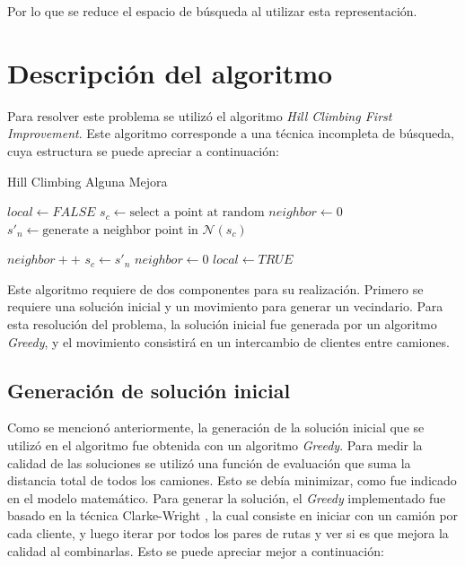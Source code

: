 \documentclass{article}
\begin{document}
Por lo que se reduce el espacio de búsqueda al utilizar esta representación. 
\newpage
\section{Descripci\'on del algoritmo}
Para resolver este problema se utilizó el algoritmo \textit{Hill Climbing First Improvement}. Este algoritmo corresponde a una técnica incompleta de búsqueda, cuya estructura se puede apreciar a continuación:
\begin{algorithm}
    \caption{Hill Climbing Alguna Mejora}\label{alg:cap}
    \begin{algorithmic}
        \State $local \gets FALSE$
        \State $s_c \gets \text{select a point at random}$
        \State $neighbor \gets 0$
        \Repeat
        \State $s'_n \gets \text{generate a neighbor point in } \mathscr{N}(s_c)$
        
        $neighbor++$
            \State $s_c \gets s'_n$
            \State $neighbor \gets 0$
        \EndIf
            \State $local \gets TRUE$
        \EndIf
    \end{algorithmic}
\end{algorithm}

Este algoritmo requiere de dos componentes para su realización. Primero se requiere una solución inicial y un movimiento para generar un vecindario. Para esta resolución del problema, la solución inicial fue generada por un algoritmo \textit{Greedy}, y el movimiento consistirá en un intercambio de clientes entre camiones.

\subsection{Generación de solución inicial}
Como se mencionó anteriormente, la generación de la solución inicial que se utilizó en el algoritmo fue obtenida con un algoritmo \textit{Greedy}. Para medir la calidad de las soluciones se utilizó una función de evaluación que suma la distancia total de todos los camiones. Esto se debía minimizar, como fue indicado en el modelo matemático. Para generar la solución, el \textit{Greedy} implementado fue basado en la técnica Clarke-Wright \cite{clarke1964scheduling}, la cual consiste en iniciar con un camión por cada cliente, y luego iterar por todos los pares de rutas y ver si es que mejora la calidad al combinarlas. Esto se puede apreciar mejor a continuación:
\end{document}
